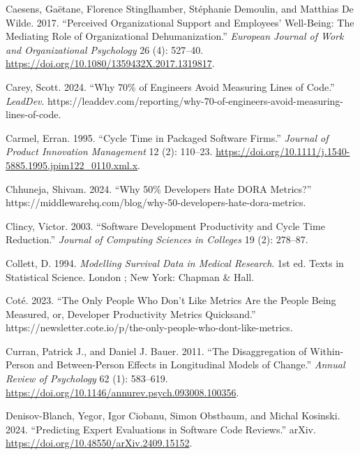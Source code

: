 \documentclass[
]{article}
\newlength{\cslhangindent}
\newenvironment{CSLReferences}[2] %
 {\begin{list}{}{%
  \setlength{\itemindent}{0pt}
  \setlength{\leftmargin}{0pt}
  \setlength{\parsep}{0pt}
  \ifodd #1
   \setlength{\leftmargin}{\cslhangindent}
   \setlength{\itemindent}{-1\cslhangindent}
  \fi
  \setlength{\itemsep}{#2\baselineskip}}}
 {\end{list}}
\begin{document}
\begin{CSLReferences}{1}{0}
Caesens, Gaëtane, Florence Stinglhamber, Stéphanie Demoulin, and
Matthias De Wilde. 2017. {``Perceived Organizational Support and
Employees' Well-Being: The Mediating Role of Organizational
Dehumanization.''} \emph{European Journal of Work and Organizational
Psychology} 26 (4): 527--40.
\url{https://doi.org/10.1080/1359432X.2017.1319817}.

Carey, Scott. 2024. {``Why 70\% of Engineers Avoid Measuring Lines of
Code.''} \emph{LeadDev}.
https://leaddev.com/reporting/why-70-of-engineers-avoid-measuring-lines-of-code.

Carmel, Erran. 1995. {``Cycle {Time} in {Packaged Software Firms}.''}
\emph{Journal of Product Innovation Management} 12 (2): 110--23.
\url{https://doi.org/10.1111/j.1540-5885.1995.jpim122_0110.xml.x}.

Chhuneja, Shivam. 2024. {``Why 50\% {Developers Hate DORA Metrics}?''}
https://middlewarehq.com/blog/why-50-developers-hate-dora-metrics.

Clincy, Victor. 2003. {``Software {Development Productivity} and {Cycle
Time Reduction}.''} \emph{Journal of Computing Sciences in Colleges} 19
(2): 278--87.

Collett, D. 1994. \emph{Modelling Survival Data in Medical Research}.
1st ed. Texts in Statistical Science. London ; New York: Chapman \&
Hall.

Coté. 2023. {``The Only People Who Don't Like Metrics Are the People
Being Measured, or, Developer Productivity Metrics Quicksand.''}
https://newsletter.cote.io/p/the-only-people-who-dont-like-metrics.

Curran, Patrick J., and Daniel J. Bauer. 2011. {``The {Disaggregation}
of {Within-Person} and {Between-Person Effects} in {Longitudinal Models}
of {Change}.''} \emph{Annual Review of Psychology} 62 (1): 583--619.
\url{https://doi.org/10.1146/annurev.psych.093008.100356}.

Denisov-Blanch, Yegor, Igor Ciobanu, Simon Obstbaum, and Michal
Kosinski. 2024. {``Predicting {Expert Evaluations} in {Software Code
Reviews}.''} arXiv. \url{https://doi.org/10.48550/arXiv.2409.15152}.


\end{CSLReferences}
\end{document}
